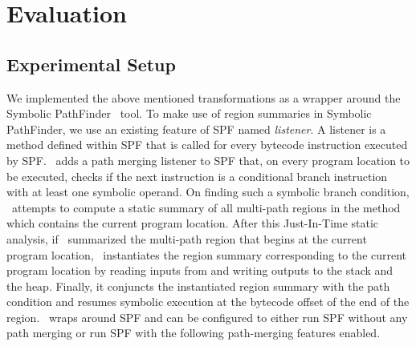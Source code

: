 \section{Evaluation}
\label{sec:results}
\subsection{Experimental Setup}
%
We implemented the above mentioned transformations as a wrapper around the Symbolic PathFinder~\cite{spf} tool.
%
To make use of region summaries in Symbolic PathFinder, we use an existing feature of SPF named \textit{listener}.
%
A listener is a method defined within SPF that is called for every bytecode instruction executed by SPF.
%
\tool\ adds a path merging listener to SPF that, on every program location to be executed, checks if the next
instruction is a conditional branch instruction with at least one symbolic operand.
%
On finding such a symbolic branch condition, \tool\ attempts to compute a static summary of all multi-path
regions in the method which contains the current program location.
%
After this Just-In-Time static analysis, if \tool\ summarized the multi-path region that begins at the current program
location, \tool\ instantiates the region summary corresponding to the current program location by reading inputs from
and writing outputs to the stack and the heap.
%
Finally, it conjuncts the instantiated region summary with the path condition and resumes symbolic execution at the
bytecode offset of the end of the region.
%
\tool\ wraps around SPF and can be configured to either run SPF without any path merging or run SPF with the
following path-merging features enabled.

